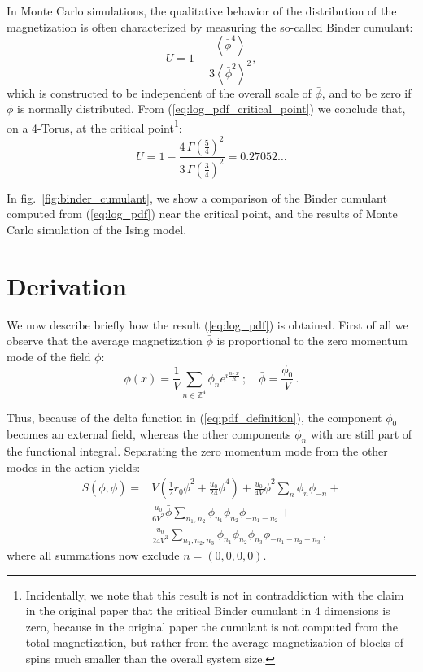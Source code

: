 \documentclass[11pt,a4paper]{article}
\begin{document}
In Monte Carlo simulations, the qualitative behavior of the distribution of the
magnetization is often characterized by measuring the so-called Binder
cumulant:
\begin{equation}
    U = 1 - \frac{\left\langle \bar \phi^4 \right \rangle}
    {3\left\langle \bar \phi^2 \right \rangle^2},
\end{equation}
which is constructed to be independent of the overall scale of $\bar{\phi}$,
and to be zero if $\bar{\phi}$ is normally distributed. From
(\ref{eq:log_pdf_critical_point}) we conclude that, on a 4-Torus, at the
critical point\footnote{ Incidentally, we note that this result is not in
contraddiction with the claim in the original paper that the critical Binder
cumulant in 4 dimensions is zero, because in the original paper the cumulant is
not computed from the total magnetization, but rather from the average
magnetization of blocks of spins much smaller than the overall system size.}:
\begin{equation}
    \label{eq:critical_binder_cumulant}
    U = 1 - \frac{4\,\Gamma\left(\frac{5}{4}\right)^2}
    {3\,\Gamma\left(\frac{3}{4}\right)^2} 
    = 0.27052\ldots
\end{equation}


In fig.~\ref{fig:binder_cumulant}, we show a comparison of the Binder cumulant
computed from (\ref{eq:log_pdf}) near the critical point, and the results of
Monte Carlo simulation of the Ising model.

\section{Derivation}

We now describe briefly how the result (\ref{eq:log_pdf}) is obtained. First of
all we observe that the average magnetization $\bar{\phi}$ is proportional to
the zero momentum mode of the field $\phi$:
\begin{equation}
    \phi(x) = \frac{1}{V} \sum_{n \in \mathbb{Z}^4} \phi_{n} 
    e^{i \frac{n\cdot x}{R}}\,;\quad \bar{\phi} = \frac{\phi_{0}}{V}\,.
\end{equation}

Thus, because of the delta function in (\ref{eq:pdf_definition}), the component
$\phi_{0}$ becomes an external field, whereas the other components $\phi_{n}$
with are still part of the functional integral. Separating the zero momentum
mode from the other modes in the action yields:
\begin{equation}
\begin{split}
    S(\bar{\phi}, \phi) =& 
    V \left(\frac{1}{2} r_0 \bar{\phi}^2 + \frac{u_0}{24} \bar{\phi}^4\right) +
    \frac{u_0}{4V} \bar{\phi}^2 \sum_{n} \phi_{n} \phi_{-n} + \\
    &\frac{u_0}{6V^2} \bar{\phi} 
        \sum_{n_1, n_2} \phi_{n_1} \phi_{n_2} \phi_{-n_1 -n_2} + \\
    &\frac{u_0}{24V^3} \sum_{n_1, n_2, n_3} \phi_{n_1} \phi_{n_2} 
        \phi_{n_3} \phi_{-n_1 -n_2 -n_3}\,,
\end{split}
\end{equation}
where all summations now exclude $n = (0, 0, 0, 0)$.
\end{document}
